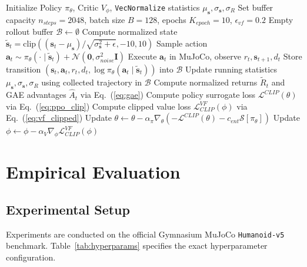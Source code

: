 \documentclass{article}
\begin{document}
\begin{algorithm}[t]
\caption{FigicalAI: Value-Stabilized PPO with Deep Exploration}
\label{alg:figicalai}
\begin{algorithmic}[1]
\STATE Initialize Policy $\pi_\theta$, Critic $V_\phi$, \texttt{VecNormalize} statistics $\mu_{\mathbf{s}}, \sigma_{\mathbf{s}}, \sigma_R$
\STATE Set buffer capacity $n_{steps} = 2048$, batch size $B = 128$, epochs $K_{epoch} = 10$, $\epsilon_{vf} = 0.2$
    \STATE Empty rollout buffer $\mathcal{B} \leftarrow \emptyset$
        \STATE Compute normalized state $\tilde{\mathbf{s}}_t = \text{clip}((\mathbf{s}_t - \mu_{\mathbf{s}})/\sqrt{\sigma_{\mathbf{s}}^2 + \epsilon}, -10, 10)$
        \STATE Sample action $\mathbf{a}_t \sim \pi_\theta(\cdot \mid \tilde{\mathbf{s}}_t) + \mathcal{N}(\mathbf{0}, \sigma_{noise}^2 \mathbf{I})$
        \STATE Execute $\mathbf{a}_t$ in MuJoCo, observe $r_t, \mathbf{s}_{t+1}, d_t$
        \STATE Store transition $(\mathbf{s}_t, \mathbf{a}_t, r_t, d_t, \log \pi_\theta(\mathbf{a}_t \mid \tilde{\mathbf{s}}_t))$ into $\mathcal{B}$
    \ENDFOR
    \STATE Update running statistics $\mu_{\mathbf{s}}, \sigma_{\mathbf{s}}, \sigma_R$ using collected trajectory in $\mathcal{B}$
    \STATE Compute normalized returns $\tilde{R}_t$ and GAE advantages $\hat{A}_t$ via Eq.~(\ref{eq:gae})
            \STATE Compute policy surrogate loss $\mathcal{L}^{CLIP}(\theta)$ via Eq.~(\ref{eq:ppo_clip})
            \STATE Compute clipped value loss $\mathcal{L}^{VF}_{CLIP}(\phi)$ via Eq.~(\ref{eq:vf_clipped})
            \STATE Update $\theta \leftarrow \theta - \alpha_\pi \nabla_\theta \left( -\mathcal{L}^{CLIP}(\theta) - c_{ent} \mathcal{S}[\pi_\theta] \right)$
            \STATE Update $\phi \leftarrow \phi - \alpha_V \nabla_\phi \mathcal{L}^{VF}_{CLIP}(\phi)$
        \ENDFOR
    \ENDFOR
\ENDFOR
\end{algorithmic}
\end{algorithm}

\section{Empirical Evaluation}
\label{sec:experiments}

\subsection{Experimental Setup}
Experiments are conducted on the official Gymnasium MuJoCo \texttt{Humanoid-v5} benchmark. Table~\ref{tab:hyperparams} specifies the exact hyperparameter configuration.
\end{document}

